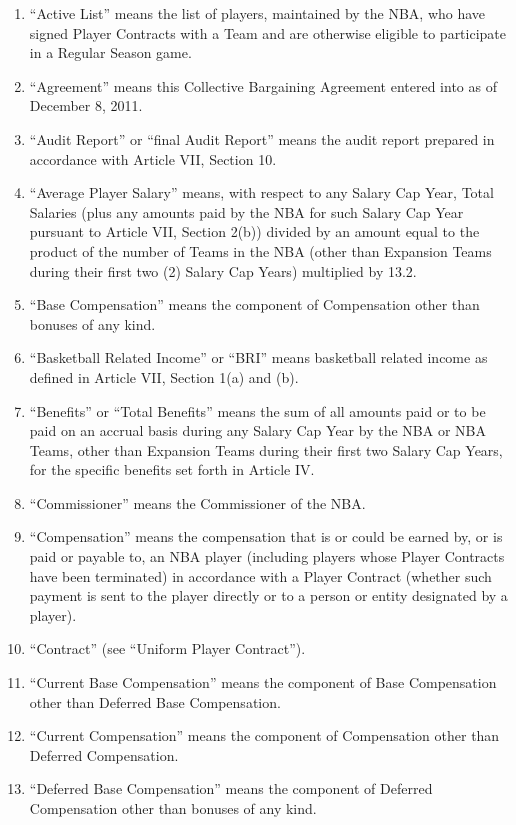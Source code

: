 \documentclass[
]{book}
\providecommand{\tightlist}{%
  \setlength{\itemsep}{0pt}\setlength{\parskip}{0pt}}
\begin{document}
\begin{enumerate}
\def\labelenumi{\arabic{enumi}.}
\tightlist
\item
  ``Active List'' means the list of players, maintained by the NBA, who have signed Player Contracts with a Team and are otherwise eligible to participate in a Regular Season game.
\item
  ``Agreement'' means this Collective Bargaining Agreement entered into as of December 8, 2011.
\item
  ``Audit Report'' or ``final Audit Report'' means the audit report prepared in accordance with Article VII, Section 10.
\item
  ``Average Player Salary'' means, with respect to any Salary Cap Year, Total Salaries (plus any amounts paid by the NBA for such Salary Cap Year pursuant to Article VII, Section 2(b)) divided by an amount equal to the product of the number of Teams in the NBA (other than Expansion Teams during their first two (2) Salary Cap Years) multiplied by 13.2.
\item
  ``Base Compensation'' means the component of Compensation other than bonuses of any kind.
\item
  ``Basketball Related Income'' or ``BRI'' means basketball related income as defined in Article VII, Section 1(a) and (b).
\item
  ``Benefits'' or ``Total Benefits'' means the sum of all amounts paid or to be paid on an accrual basis during any Salary Cap Year by the NBA or NBA Teams, other than Expansion Teams during their first two Salary Cap Years, for the specific benefits set forth in Article IV.
\item
  ``Commissioner'' means the Commissioner of the NBA.
\item
  ``Compensation'' means the compensation that is or could be earned by, or is paid or payable to, an NBA player (including players whose Player Contracts have been terminated) in accordance with a Player Contract (whether such payment is sent to the player directly or to a person or entity designated by a player).
\item
  ``Contract'' (see ``Uniform Player Contract'').
\item
  ``Current Base Compensation'' means the component of Base Compensation other than Deferred Base Compensation.
\item
  ``Current Compensation'' means the component of Compensation other than Deferred Compensation.
\item
  ``Deferred Base Compensation'' means the component of Deferred Compensation other than bonuses of any kind.

\end{enumerate}
\end{document}
